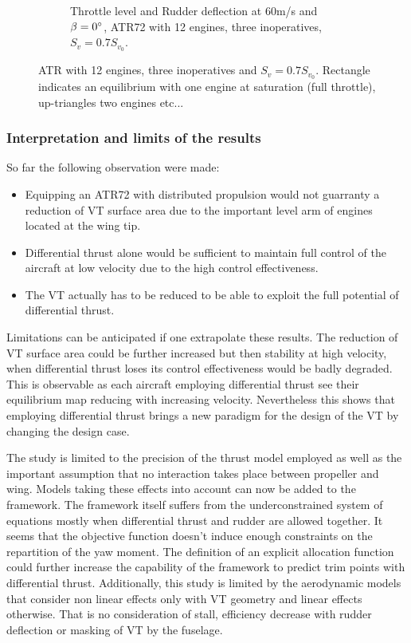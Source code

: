 \begin{figure}[hbt!]
\begin{subfigure}{0.49\textwidth}
		\caption{Throttle level and Rudder deflection at 60m/s and $\beta=0\degree$, ATR72 with 12 engines, three inoperatives, $S_v=0.7S_{v_0}$.}
		\label{fig:DeflDEPoriginalfin07_15Eng}
	\end{subfigure}
	\caption{ATR with 12 engines, three inoperatives and $S_v=0.7S_{v_0}$. Rectangle indicates an equilibrium with one engine at saturation (full throttle), up-triangles two engines etc...}\label{fig:DEPfin07_15enginesMap+Defl}
\end{figure}

\subsubsection{Interpretation and limits of the results}
So far the following observation were made:
\begin{itemize}
	\item Equipping an ATR72 with distributed propulsion would not guarranty a reduction of VT surface area due to the important level arm of engines located at the wing tip.
	\item Differential thrust alone would be sufficient to maintain full control of the aircraft at low velocity due to the high control effectiveness.
	\item The VT actually has to be reduced to be able to exploit the full potential of differential thrust.
\end{itemize}
\vspace{0.25cm}
Limitations can be anticipated if one extrapolate these results. The reduction of VT surface area could be further increased but then stability at high velocity, when differential thrust loses its control effectiveness would be badly degraded. This is observable as each aircraft employing differential thrust see their equilibrium map reducing with increasing velocity. Nevertheless this shows that employing differential thrust brings a new paradigm for the design of the VT by changing the design case.

The study is limited to the precision of the thrust model employed as well as the important assumption that no interaction takes place between propeller and wing. Models taking these effects into account can now be added to the framework.
The framework itself suffers from the underconstrained system of equations mostly when differential thrust and rudder are allowed together. It seems that the objective function doesn't induce enough constraints on the repartition of the yaw moment. The definition of an explicit allocation function could further increase the capability of the framework to predict trim points with differential thrust. Additionally, this study is limited by the aerodynamic models that consider non linear effects only with VT geometry and linear effects otherwise. That is no consideration of stall, efficiency decrease with rudder deflection or masking of VT by the fuselage.

